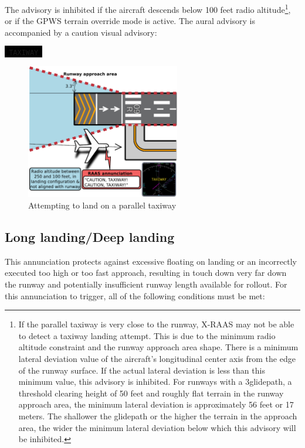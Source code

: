 \documentclass[a4paper,12pt]{article}
\newcommand{\visualadvisory}[3][b]{%
    \ifthenelse{\equal{#1}{b}}{\begin{center}}{}
    \noindent
    \colorbox{black}{\textcolor{#2visualadvisorycolor}{\large\texttt{~#3~}}}
    \ifthenelse{\equal{#1}{b}}{\end{center}}{}}
\begin{document}
\noindent The advisory is inhibited if the aircraft descends below 100
feet radio altitude\footnote{If the parallel taxiway is very close to the
runway, X-RAAS may not be able to detect a taxiway landing attempt. This
is due to the minimum radio altitude constraint and the runway approach
area shape. There is a minimum lateral deviation value of the aircraft's
longitudinal center axis from the edge of the runway surface. If the
actual lateral deviation is less than this minimum value, this advisory
is inhibited. For runways with a 3\degree glidepath, a threshold clearing
height of 50 feet and roughly flat terrain in the runway approach area,
the minimum lateral deviation is approximately 56 feet or 17 meters. The
shallower the glidepath or the higher the terrain in the approach area,
the wider the minimum lateral deviation below which this advisory will be
inhibited.}, or if the GPWS terrain override mode is active. The aural
advisory is accompanied by a caution visual advisory:

\visualadvisory{nonroutine}{TAXIWAY}

\begin{figure}[H]
\begin{center}
\includegraphics[width=0.6\textwidth]{../src/off_rwy_landing.pdf}
\end{center}
\caption{Attempting to land on a parallel taxiway}
\end{figure}

\subsection{Long landing/Deep landing}
\label{subsec:LongLandingMon}

This annunciation protects against excessive floating on landing or an
incorrectly executed too high or too fast approach, resulting in touch
down very far down the runway and potentially insufficient runway length
available for rollout. For this annunciation to trigger, all of the
following conditions must be met:
\end{document}
